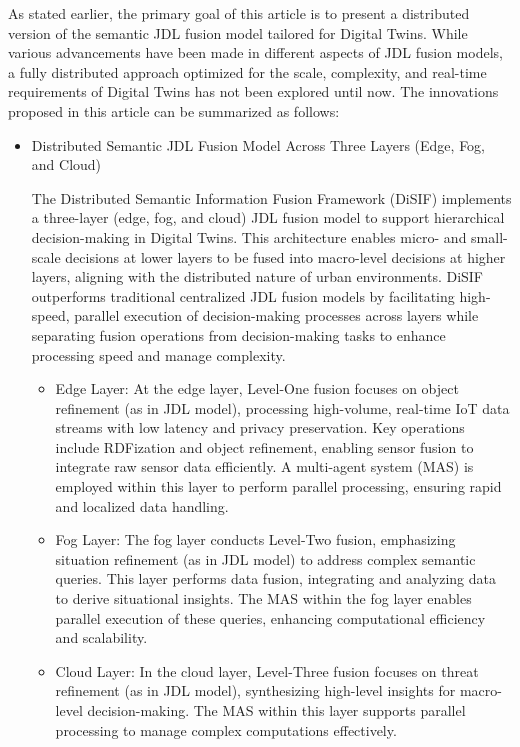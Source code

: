 \documentclass[5p,times]{elsarticle}
\begin{document}
   As stated earlier, the primary goal of this article is to present
 a distributed version of the semantic JDL fusion model tailored
 for Digital Twins. While various advancements have
 been made in different aspects of JDL fusion models, a fully
 distributed approach optimized for the scale, complexity, and
 real-time requirements of Digital Twins has not been explored
 until now. The innovations proposed in this article can be summarized as follows:

 \begin{itemize}
  \item Distributed Semantic JDL Fusion Model Across Three Layers (Edge, Fog, and Cloud)
  
  The Distributed Semantic Information Fusion Framework (DiSIF) implements
   a three-layer (edge, fog, and cloud) JDL fusion model to support hierarchical
    decision-making in Digital Twins. This architecture enables
     micro- and small-scale decisions at lower layers to be fused into macro-level 
     decisions at higher layers, aligning with the distributed nature of urban
      environments. DiSIF outperforms traditional centralized JDL fusion models
       by facilitating high-speed, parallel execution of decision-making processes
        across layers while separating fusion operations from decision-making tasks
         to enhance processing speed and manage complexity.
  \begin{itemize}
    \item Edge Layer: At the edge layer, Level-One fusion focuses
     on object refinement (as in JDL model), processing high-volume, real-time IoT data
      streams with low latency and privacy preservation.
       Key operations include RDFization and object refinement,
        enabling sensor fusion to integrate raw sensor
         data efficiently.
          A multi-agent system (MAS) is
          employed within this layer to perform parallel processing,
           ensuring rapid and localized data handling.
    \item Fog Layer: The fog layer conducts Level-Two fusion,
     emphasizing situation refinement (as in JDL model) to address complex semantic 
     queries. This layer performs data fusion, integrating
      and analyzing data to derive situational insights. The MAS within the 
      fog layer enables parallel execution of these queries,
       enhancing computational efficiency and scalability.
    \item Cloud Layer: In the cloud layer, 
    Level-Three fusion focuses on threat refinement (as in JDL model),
     synthesizing high-level insights for macro-level decision-making.
      The MAS within this layer supports parallel processing to
       manage complex computations effectively.
  \end{itemize}


\end{itemize}
\end{document}
